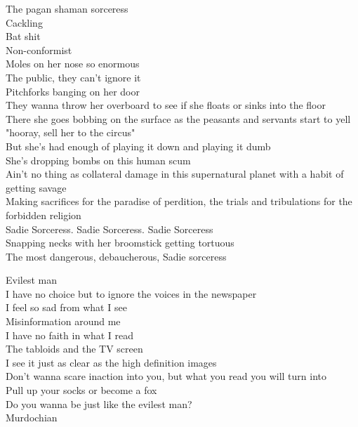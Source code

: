 The pagan shaman sorceress\\
Cackling\\
Bat shit\\
Non-conformist\\
Moles on her nose so enormous\\
The public, they can't ignore it\\
Pitchforks banging on her door\\
They wanna throw her overboard to see if she floats or sinks into the floor\\
There she goes bobbing on the surface as the peasants and servants start to yell "hooray, sell her to the circus"\\
But she's had enough of playing it down and playing it dumb\\
She's dropping bombs on this human scum\\
Ain't no thing as collateral damage in this supernatural planet with a habit of getting savage\\
Making sacrifices for the paradise of perdition, the trials and tribulations for the forbidden religion\\

Sadie Sorceress. Sadie Sorceress. Sadie Sorceress\\
Snapping necks with her broomstick getting tortuous\\

The most dangerous, debaucherous, Sadie sorceress\\




Evilest man\\

I have no choice but to ignore the voices in the newspaper\\
I feel so sad from what I see\\
Misinformation around me\\

I have no faith in what I read\\
The tabloids and the TV screen\\
I see it just as clear as the high definition images\\

Don't wanna scare inaction into you, but what you read you will turn into\\
Pull up your socks or become a fox\\
Do you wanna be just like the evilest man?\\
Murdochian\\

